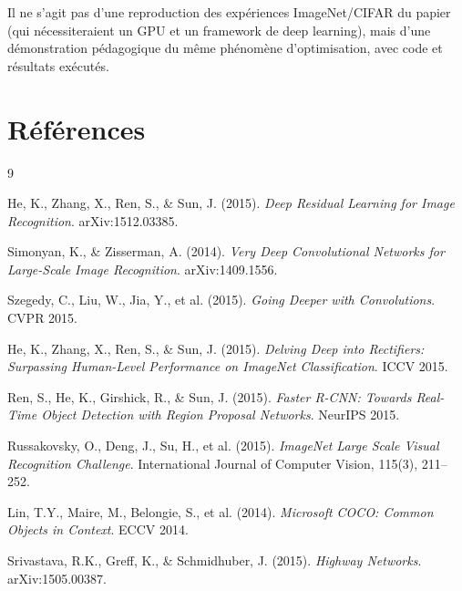 \documentclass[a4paper,11pt]{article}
\begin{document}
Il ne s'agit pas d'une reproduction des expériences ImageNet/CIFAR du papier (qui nécessiteraient un GPU et un framework de deep learning), mais d'une démonstration pédagogique du même phénomène d'optimisation, avec code et résultats exécutés.

\section{Références}
\begin{thebibliography}{9}

He, K., Zhang, X., Ren, S., \& Sun, J. (2015).
\textit{Deep Residual Learning for Image Recognition}.
arXiv:1512.03385.

Simonyan, K., \& Zisserman, A. (2014).
\textit{Very Deep Convolutional Networks for Large-Scale Image Recognition}.
arXiv:1409.1556.

Szegedy, C., Liu, W., Jia, Y., et al. (2015).
\textit{Going Deeper with Convolutions}.
CVPR 2015.

He, K., Zhang, X., Ren, S., \& Sun, J. (2015).
\textit{Delving Deep into Rectifiers: Surpassing Human-Level Performance on ImageNet Classification}.
ICCV 2015.

Ren, S., He, K., Girshick, R., \& Sun, J. (2015).
\textit{Faster R-CNN: Towards Real-Time Object Detection with Region Proposal Networks}.
NeurIPS 2015.

Russakovsky, O., Deng, J., Su, H., et al. (2015).
\textit{ImageNet Large Scale Visual Recognition Challenge}.
International Journal of Computer Vision, 115(3), 211--252.

Lin, T.Y., Maire, M., Belongie, S., et al. (2014).
\textit{Microsoft COCO: Common Objects in Context}.
ECCV 2014.

Srivastava, R.K., Greff, K., \& Schmidhuber, J. (2015).
\textit{Highway Networks}.
arXiv:1505.00387.

\end{thebibliography}
\end{document}
